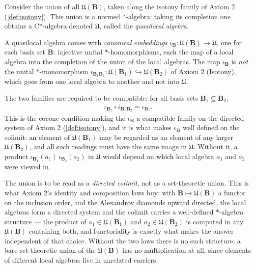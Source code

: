 \begin{definition}
    \label{def:quasilocal-algebra}
    \leanok
    Consider the union of all $\mathfrak{U}(\mathbf{B})$, taken along the isotony family of Axiom 2 (\ref{def:isotony}). This union is a normed *-algebra; taking its completion one obtains a C*-algebra denoted $\mathfrak{U}$, called the \textit{quasilocal algebra}.

    A quasilocal algebra comes with \emph{canonical embeddings} $\iota_{\mathbf{B}} : \mathfrak{U}(\mathbf{B}) \to \mathfrak{U}$, one for each basis set $\mathbf{B}$: injective unital $*$-homomorphisms, each the map of a local algebra into the completion of the union of the local algebras. The map $\iota_{\mathbf{B}}$ is \emph{not} the unital $*$-monomorphism $i_{\mathbf{B}_1\mathbf{B}_2} : \mathfrak{U}(\mathbf{B}_1) \hookrightarrow \mathfrak{U}(\mathbf{B}_2)$ of Axiom 2 (Isotony), which goes from one local algebra to another and not into $\mathfrak{U}$.

    The two families are required to be compatible: for all basis sets $\mathbf{B}_1 \subseteq \mathbf{B}_2$,
    \begin{align}
        \iota_{\mathbf{B}_2} \circ i_{\mathbf{B}_1\mathbf{B}_2} = \iota_{\mathbf{B}_1}.
    \end{align}
    This is the cocone condition making the $\iota_{\mathbf{B}}$ a compatible family on the directed system of Axiom 2 (\ref{def:isotony}), and it is what makes $\iota_{\mathbf{B}}$ well defined on the colimit: an element of $\mathfrak{U}(\mathbf{B}_1)$ may be regarded as an element of any larger $\mathfrak{U}(\mathbf{B}_2)$, and all such readings must have the same image in $\mathfrak{U}$. Without it, a product $\iota_{\mathbf{B}_1}(a_1)\, \iota_{\mathbf{B}_2}(a_2)$ in $\mathfrak{U}$ would depend on which local algebra $a_1$ and $a_2$ were viewed in.

    The union is to be read as a \emph{directed colimit}, not as a set-theoretic union. This is what Axiom 2's identity and composition laws buy: with $\mathbf{B} \mapsto \mathfrak{U}(\mathbf{B})$ a functor on the inclusion order, and the Alexandrov diamonds upward directed, the local algebras form a directed system and the colimit carries a well-defined $*$-algebra structure --- the product of $a_1 \in \mathfrak{U}(\mathbf{B}_1)$ and $a_2 \in \mathfrak{U}(\mathbf{B}_2)$ is computed in any $\mathfrak{U}(\mathbf{B})$ containing both, and functoriality is exactly what makes the answer independent of that choice. Without the two laws there is no such structure: a bare set-theoretic union of the $\mathfrak{U}(\mathbf{B})$ has no multiplication at all, since elements of different local algebras live in unrelated carriers.


\end{definition}

